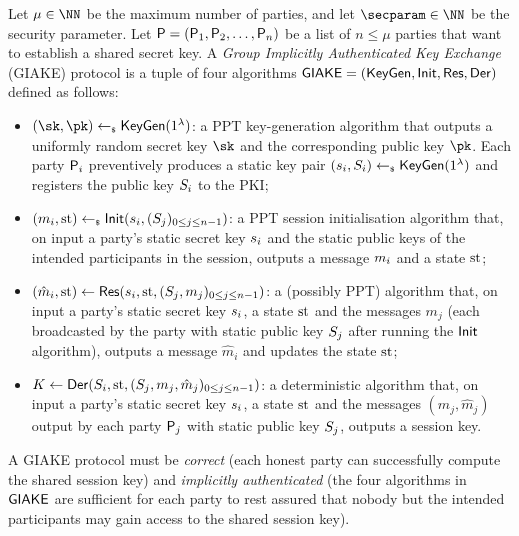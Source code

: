 \begin{plaindef}[GIAKE]\label{def:GKE}
	Let $\mu \in \NN$ be the maximum number of parties, and let $\secparam\in \NN$ be the security parameter. 
	Let $\PartySet = (\User[1],\User[2],\dots,\allowbreak \User[n])$ be a list of $n \leq \mu$ parties that want to establish a shared secret key.
	A \textit{Group Implicitly Authenticated Key Exchange} (GIAKE) protocol is a tuple of four algorithms $\GIAKE = (\KeyGen, \GAKEIni, \GAKERes, \GAKEDer)$ defined as follows:
	\begin{itemize}
		\item $(\sk,\pk) \getsr \KeyGen(1^\secpar)$: a PPT key-generation algorithm that outputs a uniformly random secret key $\sk$ and the corresponding public key $\pk$.
		Each party $\User[i]$ preventively produces a static key pair $(\ssk_i,\spk_i) \getsr \KeyGen(1^\secpar)$ and registers the public key $\spk_i$ to the PKI;
		\item $(m_i,\st) \getsr \GAKEIni (\ssk_i,(\spk_j)_{0\leq j \leq n-1})$: a PPT session initialisation algorithm that, on input a party's static secret key $\ssk_i$ and the static public keys of the intended participants in the session, outputs a message $\messageIni$ and a state $\st$;
		\item $(\hat{m}_i,\st) \gets \GAKERes(\ssk_i,\st,(\spk_j,m_j)_{0\leq j \leq n-1})$: a (possibly PPT) algorithm that, on input a party's static secret key $\ssk_i$, a state $\st$ and the messages $m_j$ (each broadcasted by the party with static public key $\spk_j$ after running the $\GAKEIni$ algorithm), outputs a message $\hat{m}_i$ and updates the state $\st$;
		\item $K \gets \GAKEDer (\spk_i,\st,(\spk_j,m_j,\hat{m}_j)_{0\leq j \leq n-1})$: a deterministic algorithm that,  on input a party's static secret key $\ssk_i$, a state $\st$ and the messages $(m_j,\hat{m}_j)$ output by each party $\User[j]$ with static public key $\spk_j$, outputs a session key.
	\end{itemize}
	A GIAKE protocol must be \textit{correct} (each honest party can successfully compute the shared session key) and \textit{implicitly authenticated} (the four algorithms in $\GIAKE$ are sufficient for each party to rest assured that nobody but the intended participants may gain access to the shared session key).
\end{plaindef}

